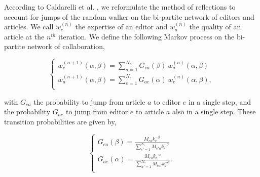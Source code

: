 According to  Caldarelli et al. \cite{caldarelli2012network}, we reformulate the method of reflections to account for jumps of the random walker on the bi-partite network of editors and articles. We call $w^{(n)}_e$ the expertise of an editor and $w^{(n)}_a$ the quality of an article at the $n^{th}$ iteration. We define the following Markov process on the bi-partite network of collaboration, 

\begin{equation}
\begin{cases}
w^{(n+1)}_e (\alpha,\beta) = \sum_{a=1}^{N_a}  G_{ea}(\beta) \,w^{(n)}_a (\alpha,\beta)\\[7pt]
w^{(n+1)}_a (\alpha,\beta) = \sum_{e=1}^{N_e}  G_{ae}(\alpha) \, w^{(n)}_e (\alpha,\beta),\\
\end{cases}
\label{random_walker}
\end{equation}

with $G_{ea}$ the probability  to jump from article $a$ to editor $e$ in a single step, and the probability $G_{ae}$ to jump from editor $e$ to article $a$ also in a single step. These transition probabilities are given by,

\begin{equation}
\begin{cases}
G_{ea}(\beta) = \frac{M_{ea} k_{e}^{-\beta}}{\sum_{e' = 1}^{N_e} M_{e'a} k_{e'}^{-\beta}}\\[10pt]
G_{ae}(\alpha) = \frac{M_{ea} k_{a}^{-\alpha}}{\sum_{a' = 1}^{N_a} M_{ea'} k_{a'}^{-\alpha}}.\\
 \end{cases}
\end{equation}


